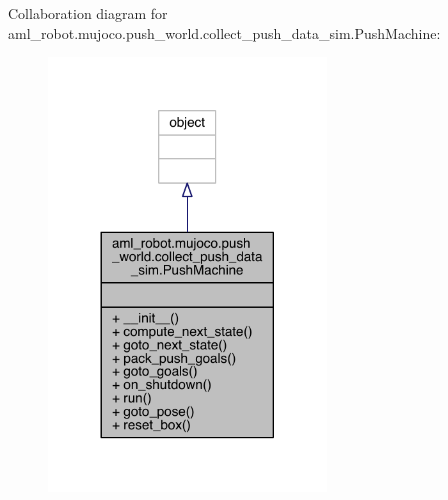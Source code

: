 Collaboration diagram for aml\+\_\+robot.\+mujoco.\+push\+\_\+world.\+collect\+\_\+push\+\_\+data\+\_\+sim.\+Push\+Machine\+:\nopagebreak
\begin{figure}[H]
\begin{center}
\leavevmode
\includegraphics[width=209pt]{classaml__robot_1_1mujoco_1_1push__world_1_1collect__push__data__sim_1_1_push_machine__coll__graph}
\end{center}
\end{figure}
